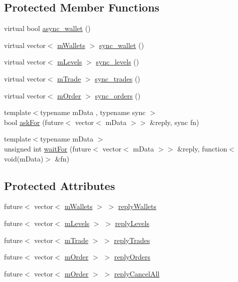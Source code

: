 \subsection*{Protected Member Functions}
\begin{DoxyCompactItemize}
\item 
virtual bool \hyperlink{class_k_1_1_gw_a69bd12a2ef6f58b5a44c15b3801c2ef2}{async\+\_\+wallet} ()
\item 
virtual vector$<$ \hyperlink{struct_k_1_1m_wallets}{m\+Wallets} $>$ \hyperlink{class_k_1_1_gw_a45b0afcbe68c422db35af9b503831be5}{sync\+\_\+wallet} ()
\item 
virtual vector$<$ \hyperlink{struct_k_1_1m_levels}{m\+Levels} $>$ \hyperlink{class_k_1_1_gw_ac20ee1cedc4725a39815f28d36470fa1}{sync\+\_\+levels} ()
\item 
virtual vector$<$ \hyperlink{struct_k_1_1m_trade}{m\+Trade} $>$ \hyperlink{class_k_1_1_gw_a41fa6e2cd171072202fa1e44fbd780c5}{sync\+\_\+trades} ()
\item 
virtual vector$<$ \hyperlink{struct_k_1_1m_order}{m\+Order} $>$ \hyperlink{class_k_1_1_gw_a96bb7b05334000c911a75894711853c4}{sync\+\_\+orders} ()
\item 
{\footnotesize template$<$typename m\+Data , typename sync $>$ }\\bool \hyperlink{class_k_1_1_gw_af6748577cac6d6171379036bcd243228}{ask\+For} (future$<$ vector$<$ m\+Data $>$$>$ \&reply, sync fn)
\item 
{\footnotesize template$<$typename m\+Data $>$ }\\unsigned int \hyperlink{class_k_1_1_gw_a96ddc8b55247c87b0ecbbba76c71b01a}{wait\+For} (future$<$ vector$<$ m\+Data $>$$>$ \&reply, function$<$ void(m\+Data)$>$ \&fn)
\end{DoxyCompactItemize}
\subsection*{Protected Attributes}
\begin{DoxyCompactItemize}
\item 
future$<$ vector$<$ \hyperlink{struct_k_1_1m_wallets}{m\+Wallets} $>$ $>$ \hyperlink{class_k_1_1_gw_af1978cbd97d41a4197e481dc8fdfa5eb}{reply\+Wallets}
\item 
future$<$ vector$<$ \hyperlink{struct_k_1_1m_levels}{m\+Levels} $>$ $>$ \hyperlink{class_k_1_1_gw_a37ee3b756d9b6633e81ff28125314fab}{reply\+Levels}
\item 
future$<$ vector$<$ \hyperlink{struct_k_1_1m_trade}{m\+Trade} $>$ $>$ \hyperlink{class_k_1_1_gw_a3648d850c8042fbb808b77b0ebec8087}{reply\+Trades}
\item 
future$<$ vector$<$ \hyperlink{struct_k_1_1m_order}{m\+Order} $>$ $>$ \hyperlink{class_k_1_1_gw_ab6cf63a19336c99e031b44359e68814f}{reply\+Orders}
\item 
future$<$ vector$<$ \hyperlink{struct_k_1_1m_order}{m\+Order} $>$ $>$ \hyperlink{class_k_1_1_gw_a02a0f0472ebae5925916a1d6661f8375}{reply\+Cancel\+All}
\end{DoxyCompactItemize}



